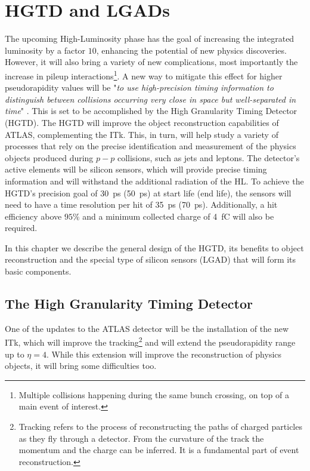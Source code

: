 \chapter{HGTD and LGADs}\label{chap:HGTD_LGADs}

The upcoming High-Luminosity phase has the goal of increasing the integrated luminosity by a factor \(10\), enhancing the potential of new physics discoveries. However, it will also bring a variety of new complications, most importantly the increase in pileup interactions\footnote{Multiple collisions happening during the same bunch crossing, on top of a main event of interest.}.
A new way to mitigate this effect for higher pseudorapidity values will be "\textit{to use high-precision timing information to distinguish between collisions occurring very close in space but well-separated in time}" \cite{CERN-LHCC-2020-007}. This is set to be accomplished by the High Granularity Timing Detector (HGTD).
The HGTD will improve the object reconstruction capabilities of ATLAS, complementing the ITk. This, in turn, will help study a variety of processes that rely on the precise identification and measurement of the physics objects produced during \(p-p\) collisions, such as jets and leptons.
The detector's active elements will be silicon sensors, which will provide precise timing information and will withstand the additional radiation of the HL. To achieve the HGTD's precision goal of \qty{30}{\pico\second} (\qty{50}{\pico\second}) at start life (end life), the sensors will need to have a time resolution per hit of \qty{35}{\pico\second} (\qty{70}{\pico\second}). Additionally, a hit efficiency above \(95\%\) and %
a minimum collected charge of \qty{4}{\femto\coulomb} will also be required.

In this chapter we describe the general design of the HGTD, its benefits to object reconstruction and the special type of silicon sensors (LGAD) that will form its basic components.

\section{The High Granularity Timing Detector}\label{sec:HGTD}
One of the updates to the ATLAS detector will be the installation of the new ITk, which will improve the tracking\footnote{Tracking refers to the process of reconstructing the paths of charged particles as they fly through a detector. From the curvature of the track the momentum and the charge can be inferred. It is a fundamental part of event reconstruction.} and will extend the pseudorapidity range up to \(\eta=4\). While this extension will improve the reconstruction of physics objects, it will bring some difficulties too.

